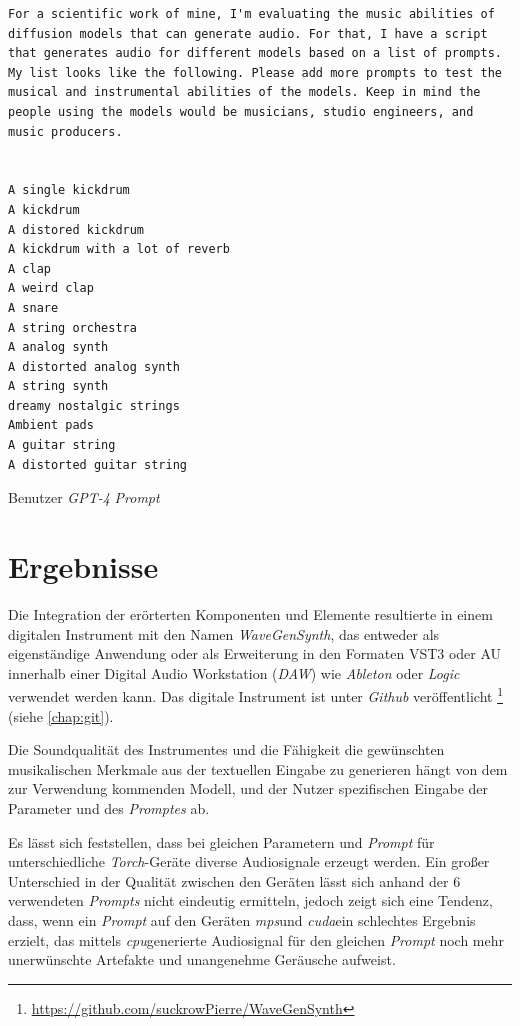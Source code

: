 \documentclass[
  a4paper,  %
  twoside,  %
  bibliography=totoc,
  headsepline,
  cleardoublepage=empty,
  parskip=half,
  draft=false
]{scrbook}
\begin{document}
\begin{Listing}
\begin{lstlisting}[style=gpt]
For a scientific work of mine, I'm evaluating the music abilities of diffusion models that can generate audio. For that, I have a script that generates audio for different models based on a list of prompts. My list looks like the following. Please add more prompts to test the musical and instrumental abilities of the models. Keep in mind the people using the models would be musicians, studio engineers, and music producers. 


A single kickdrum
A kickdrum
A distored kickdrum
A kickdrum with a lot of reverb
A clap
A weird clap
A snare
A string orchestra
A analog synth
A distorted analog synth
A string synth
dreamy nostalgic strings
Ambient pads
A guitar string
A distorted guitar string
\end{lstlisting}
    \caption{Benutzer \emph{GPT-4} \emph{Prompt}}
  \label{lst:prompt}
\end{Listing}

\chapter{Ergebnisse}
Die Integration der erörterten Komponenten und Elemente resultierte in einem digitalen Instrument mit den Namen \emph{WaveGenSynth}, das entweder als eigenständige Anwendung oder als Erweiterung in den Formaten VST3 oder AU innerhalb einer Digital Audio Workstation (\emph{DAW}) wie \emph{Ableton} \cite{noauthor_ableton_nodate} oder \emph{Logic} \cite{noauthor_logic_nodate} verwendet werden kann. Das digitale Instrument ist unter \emph{Github} \cite{noauthor_github_nodate} veröffentlicht \footnote{\url{https://github.com/suckrowPierre/WaveGenSynth}} (siehe \ref{chap:git}). 

Die Soundqualität des Instrumentes und die Fähigkeit die gewünschten musikalischen Merkmale aus der textuellen Eingabe zu generieren hängt von dem zur Verwendung kommenden Modell, und der Nutzer spezifischen Eingabe der Parameter und des \emph{Promptes} ab. 

Es lässt sich feststellen, dass bei gleichen Parametern und \emph{Prompt} für unterschiedliche \emph{Torch}-Geräte diverse Audiosignale erzeugt werden. Ein großer Unterschied in der Qualität zwischen den Geräten lässt sich anhand der $6$ verwendeten \emph{Prompts} nicht eindeutig ermitteln, jedoch zeigt sich eine Tendenz, dass, wenn ein \emph{Prompt} auf den Geräten \glqq\emph{mps}\grqq und \glqq\emph{cuda}\grqq ein schlechtes Ergebnis erzielt, das mittels \glqq\emph{cpu}\grqq generierte Audiosignal für den gleichen \emph{Prompt} noch mehr unerwünschte Artefakte und unangenehme Geräusche aufweist.
\end{document}
